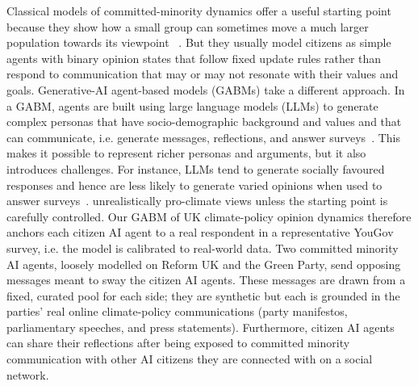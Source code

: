 \documentclass[pdflatex,sn-mathphys-num]{sn-jnl}%
\theoremstyle{thmstyleone}%
\theoremstyle{thmstyletwo}%
\theoremstyle{thmstylethree}%
\begin{document}
Classical models of committed-minority dynamics offer a useful starting point because
they show how a small group can sometimes move a much larger population towards its
viewpoint ~\cite{centola2018, granovetter1978, galam2002}. But they usually model
citizens as simple agents with binary opinion states that follow fixed update rules
rather than respond to communication that may or may not resonate with their values and
goals. Generative-AI agent-based models (GABMs) take a different approach. In a GABM,
agents are built using large language models (LLMs) to generate complex personas that
have socio-demographic background and values and that can communicate, i.e. generate
messages, reflections, and answer surveys~\cite{park2023, tornberg2023,
ghaffarzadegan2024, vezhnevets2023concordia}. This makes it possible to represent richer
personas and arguments, but it also introduces challenges. For instance, LLMs tend to
generate socially favoured responses and hence are less likely to generate varied
opinions when used to answer surveys~\cite{argyle2023, santurkar2023, bisbee2024,
manivannan2026}. %
unrealistically pro-climate views unless the starting point is carefully controlled.
Our GABM of UK climate-policy opinion dynamics therefore anchors each citizen AI agent
to a real respondent in a
representative YouGov survey, i.e. the model is calibrated to real-world data. Two
committed minority AI agents, loosely
modelled on Reform UK and the Green Party, send opposing messages meant to sway the
citizen AI agents. These messages are drawn from a fixed, curated pool for each side;
they are synthetic but each is grounded in the parties' real online climate-policy
communications (party manifestos, parliamentary speeches, and press statements).
Furthermore, citizen AI agents
can share their reflections after being exposed to committed minority communication with
other AI citizens they are connected with on a social network.
\end{document}
